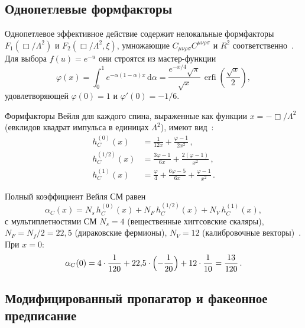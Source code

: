 \documentclass[12pt,a4paper]{article}
\theoremstyle{plain}
\theoremstyle{definition}
\theoremstyle{remark}
\newcommand{\dd}{\mathrm{d}}
\newcommand{\erfi}{\operatorname{erfi}}
\begin{document}
\subsection{Однопетлевые формфакторы}
\label{sec:formfactors}

Однопетлевое эффективное действие содержит нелокальные формфакторы
$F_1(\Box/\Lambda^2)$ и $F_2(\Box/\Lambda^2, \xi)$, умножающие
$C_{\mu\nu\rho\sigma}C^{\mu\nu\rho\sigma}$ и $R^2$
соответственно~\cite{BV:1987,BV:1990}. Для выбора $f(u) = e^{-u}$
они строятся из мастер-функции
\begin{equation}\label{eq:master}
  \varphi(x) = \int_0^1 e^{-\alpha(1-\alpha)x}\, \dd\alpha
  = \frac{e^{-x/4}\sqrt{\pi}}{\sqrt{x}}\,
  \erfi\!\left(\frac{\sqrt{x}}{2}\right),
\end{equation}
удовлетворяющей $\varphi(0) = 1$ и $\varphi'(0) = -1/6$.

Формфакторы Вейля для каждого спина, выраженные как функции
$x = -\Box/\Lambda^2$ (евклидов квадрат импульса в единицах
$\Lambda^2$), имеют вид~\cite{CZ:2012,Alfyorov:2026paper1}:
\begin{align}
  h_C^{(0)}(x) &= \frac{1}{12x}
    + \frac{\varphi - 1}{2x^2}\,,
  \label{eq:hC-scalar}\\[4pt]
  h_C^{(1/2)}(x) &= \frac{3\varphi - 1}{6x}
    + \frac{2(\varphi - 1)}{x^2}\,,
  \label{eq:hC-dirac}\\[4pt]
  h_C^{(1)}(x) &= \frac{\varphi}{4}
    + \frac{6\varphi - 5}{6x}
    + \frac{\varphi - 1}{x^2}\,.
  \label{eq:hC-vector}
\end{align}

Полный коэффициент Вейля СМ равен
\begin{equation}\label{eq:alpha-C-def}
  \alpha_C(x) = N_s\, h_C^{(0)}(x)
    + N_F\, h_C^{(1/2)}(x)
    + N_V\, h_C^{(1)}(x),
\end{equation}
с мультиплетностями СМ $N_s = 4$ (вещественные хиггсовские скаляры),
$N_F = N_f/2 = 22{,}5$ (дираковские фермионы), $N_V = 12$
(калибровочные векторы)~\cite{CPR:2008}. При $x = 0$:
\begin{equation}\label{eq:alpha-C-value}
  \alpha_C(0) = 4 \cdot \frac{1}{120}
    + 22{,}5 \cdot \Bigl(-\frac{1}{20}\Bigr)
    + 12 \cdot \frac{1}{10} = \frac{13}{120}\,.
\end{equation}

\subsection{Модифицированный пропагатор и факеонное предписание}
\label{sec:propagator}
\end{document}
